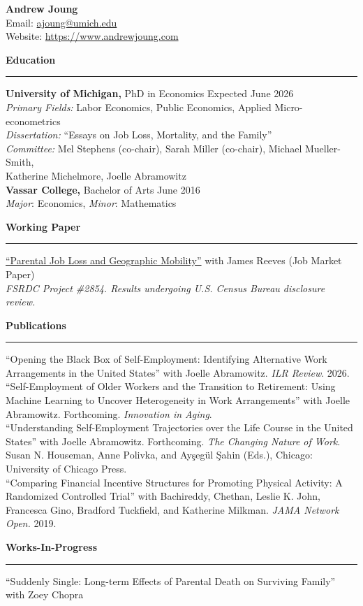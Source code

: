 \documentclass[12pt,letterpaper]{article}
\newcommand{\cvheading}[1]{%
    \par\vspace{0.5cm}
    {\Large \textbf{#1}}
    \vspace{0.1cm}
    \hrule
    \vspace{0.2cm}
}
\begin{document}
{\LARGE \textbf{Andrew Joung}}\\
Email: \url{ajoung@umich.edu} \\
Website:  \url{https://www.andrewjoung.com} \\
\cvheading{Education}
\textbf{University of Michigan,} PhD in Economics \hfill Expected June 2026\\
\textit{Primary Fields:} Labor Economics, Public Economics, Applied Micro-econometrics\\
\textit{Dissertation:} ``Essays on Job Loss, Mortality, and the Family''\\
\textit{Committee:} Mel Stephens (co-chair), Sarah Miller (co-chair), Michael Mueller-Smith,\\
\hspace*{1.65cm} Katherine Michelmore, Joelle Abramowitz
\\[0.2cm]
\textbf{Vassar College,} Bachelor of Arts \hfill June 2016\\
\textit{Major}: Economics, \textit{Minor}: Mathematics
\cvheading{Working Paper}
\href{https://andrewjoung.com/JoungAndrew_JMP.pdf}{``Parental Job Loss and Geographic Mobility''} with James Reeves (Job Market Paper) \\
\textit{FSRDC Project \#2854. Results undergoing U.S. Census Bureau disclosure review.}
\cvheading{Publications}
``Opening the Black Box of Self-Employment: Identifying Alternative Work Arrangements in the United States'' with Joelle Abramowitz. \textit{ILR Review}. 2026.
\\[0.2cm]
``Self-Employment of Older Workers and the Transition to Retirement: Using Machine Learning to Uncover Heterogeneity in Work Arrangements'' with Joelle Abramowitz. Forthcoming. \textit{Innovation in Aging}.
\\[0.2cm]
``Understanding Self-Employment Trajectories over the Life Course in the United States'' with Joelle Abramowitz. Forthcoming. \textit{The Changing Nature of Work}. Susan N. Houseman, Anne Polivka, and Ayşegül Şahin (Eds.), Chicago: University of Chicago Press.
\\[0.2cm]
``Comparing Financial Incentive Structures for Promoting Physical Activity: A Randomized Controlled Trial'' with Bachireddy, Chethan, Leslie K. John, Francesca Gino, Bradford Tuckfield, and Katherine Milkman. \textit{JAMA Network Open.} 2019.
\cvheading{Works-In-Progress}
``Suddenly Single: Long-term Effects of Parental Death on Surviving Family'' with Zoey Chopra \\
\end{document}
